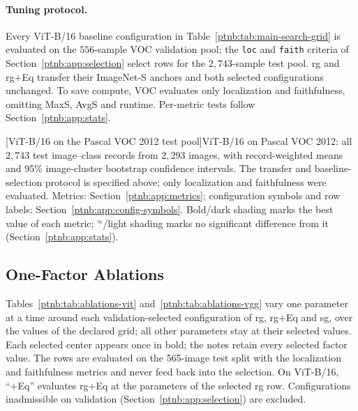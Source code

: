\paragraph{Tuning protocol.}
Every ViT-B/16 baseline configuration in Table~\ref{ptnb:tab:main-search-grid} is evaluated on the $556$-sample VOC validation pool; the \texttt{loc} and \texttt{faith} criteria of Section~\ref{ptnb:app:selection} select rows for the $2{,}743$-sample test pool. \ac{rg} and \ac{rg}+Eq transfer their ImageNet-S anchors and both selected configurations unchanged. To save compute, VOC evaluates only localization and faithfulness, omitting MaxS, AvgS and runtime. Per-metric tests follow Section~\ref{ptnb:app:stats}.

\begin{center}
    \captionsetup{hypcap=false}
    [ViT-B/16 on the Pascal VOC 2012 test pool]{ViT-B/16 on Pascal VOC 2012: all $2{,}743$ test image--class records from $2{,}293$ images, with record-weighted means and 95\% image-cluster bootstrap confidence intervals. The transfer and baseline-selection protocol is specified above; only localization and faithfulness were evaluated. Metrics: Section~\ref{ptnb:app:metrics}; configuration symbols and row labels: Section~\ref{ptnb:app:config-symbols}. Bold/dark shading marks the best value of each metric; $^{\approx}$/light shading marks no significant difference from it (Section~\ref{ptnb:app:stats}).}
    \label{ptnb:tab:eval-vit-voc}
\end{center}
\captionsetup{hypcap=true}

\providecommand{\absval}[2]{
\begin{tabular}[c]{@{}c@{}}#1\\\textcolor{gray!70}{\scriptsize #2}\end{tabular}}

\subsection{One-Factor Ablations}\label{ptnb:app:abl-one-factor}\label{ptnb:app:tradeoff-sweeps}\label{ptnb:app:dual-sweeps}\label{app:dual-sweeps}
Tables~\ref{ptnb:tab:ablations-vit} and~\ref{ptnb:tab:ablations-vgg} vary one parameter at a time around each validation-selected configuration of \ac{rg}, \ac{rg}+Eq and \ac{sg}, over the values of the declared grid; all other parameters stay at their selected values. Each selected center appears once in bold; the notes retain every selected factor value. The rows are evaluated on the 565-image test split with the localization and faithfulness metrics and never feed back into the selection. On ViT-B/16, ``+Eq'' evaluates \ac{rg}+Eq at the parameters of the selected \ac{rg} row. Configurations inadmissible on validation (Section~\ref{ptnb:app:selection}) are excluded.

